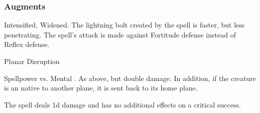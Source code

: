\subsubsection{Augments}
 Intensified, Widened.
The lightning bolt created by the spell is faster, but less penetrating.
The spell's attack is made against Fortitude defense instead of Reflex defense.
\begin{spellsection}{Planar Disruption}
\begin{spellheader}
\end{spellheader}
\begin{spellcontent}
\begin{spelltargetinginfo}
\end{spelltargetinginfo}
\begin{spelleffects}
\begin{spellattack}{Spellpower vs. Mental}
\spellsuccess {}.
\spellcritical
As above, but double damage.
In addition, if the creature is an  native to another plane, it is sent back to its home plane.
\end{spellattack}
\end{spelleffects}
\end{spellcontent}
\begin{spellfooter}
\miscastexplode
\end{spellfooter}
\begin{spellcantrip}
The spell deals \minus1d damage and has no additional effects on a critical success.
\end{spellcantrip}
\end{spellsection}
